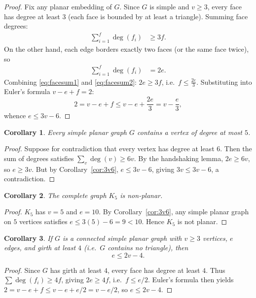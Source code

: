 \documentclass[12pt,a4paper]{article}
\theoremstyle{definition}
\theoremstyle{plain}
\newtheorem{corollary}{Corollary}[section]
\theoremstyle{remark}
\begin{document}
\begin{proof}
  Fix any planar embedding of $G$.  Since $G$ is simple and $v \geq 3$, every
  face has degree at least $3$ (each face is bounded by at least a triangle).
  Summing face degrees:
  \begin{align}
    \sum_{i=1}^{f} \deg(f_i) &\geq 3f. \label{eq:facesum1}
  \end{align}
  On the other hand, each edge borders exactly two faces (or the same face
  twice), so
  \begin{align}
    \sum_{i=1}^{f} \deg(f_i) &= 2e. \label{eq:facesum2}
  \end{align}
  Combining \eqref{eq:facesum1} and \eqref{eq:facesum2}: $2e \geq 3f$, i.e.\
  $f \leq \tfrac{2e}{3}$.  Substituting into Euler's formula
  $v - e + f = 2$:
  \[
    2 = v - e + f \leq v - e + \frac{2e}{3} = v - \frac{e}{3},
  \]
  whence $e \leq 3v - 6$.
\end{proof}

\begin{corollary}\label{cor:deg5}
  Every simple planar graph $G$ contains a vertex of degree at most $5$.
\end{corollary}

\begin{proof}
  Suppose for contradiction that every vertex has degree at least $6$.  Then the
  sum of degrees satisfies $\sum_{v} \deg(v) \geq 6v$.  By the handshaking lemma,
  $2e \geq 6v$, so $e \geq 3v$.  But by Corollary~\ref{cor:3v6}, $e \leq 3v-6$,
  giving $3v \leq 3v - 6$, a contradiction.
\end{proof}

\begin{corollary}\label{cor:K5}
  The complete graph $K_5$ is non-planar.
\end{corollary}

\begin{proof}
  $K_5$ has $v=5$ and $e=10$.  By Corollary~\ref{cor:3v6}, any simple planar
  graph on $5$ vertices satisfies $e \leq 3(5)-6 = 9 < 10$.  Hence $K_5$ is
  not planar.
\end{proof}

\begin{corollary}\label{cor:2v4}
  If $G$ is a connected simple planar graph with $v \geq 3$ vertices, $e$ edges,
  and girth at least $4$ (i.e.\ $G$ contains no triangle), then
  \[
    e \leq 2v - 4.
  \]
\end{corollary}

\begin{proof}
  Since $G$ has girth at least $4$, every face has degree at least $4$.  Thus
  $\sum \deg(f_i) \geq 4f$, giving $2e \geq 4f$, i.e.\ $f \leq e/2$.
  Euler's formula then yields $2 = v-e+f \leq v-e+e/2 = v-e/2$, so $e \leq 2v-4$.
\end{proof}
\end{document}
